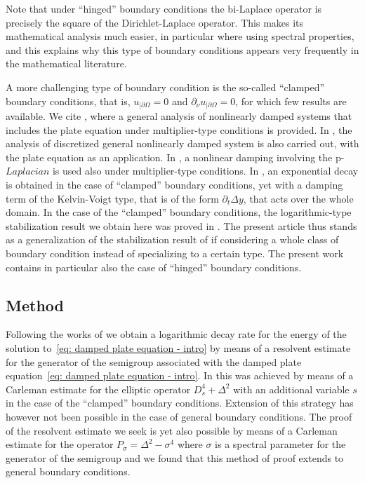\documentclass[10pt]{amsart}
\theoremstyle{plain}
\theoremstyle{definition}
\newcommand{\Psig}{P_{\sigma}}
\begin{document}
Note that under ``hinged'' boundary conditions the bi-Laplace operator
is precisely the square of the Dirichlet-Laplace operator. This makes
its mathematical analysis much easier, in particular where using
spectral properties, and this explains why this type of boundary
conditions appears very frequently in the mathematical literature.

A more challenging type of boundary condition is the so-called
``clamped'' boundary conditions,
that is, $u_{|\partial \Omega}=0$ and $\partial_\nu u_{|\partial \Omega}=0$,
for which few results are available. We
cite \cite{Alabau:06}, where a general analysis of nonlinearly damped
systems that includes the plate equation
under multiplier-type conditions is provided. In \cite{APT:17}, the
analysis of discretized general nonlinearly damped system is also
carried out, with the plate equation as an application. In \cite{Tebou:12}, a nonlinear
damping involving the p-$Laplacian$ is used also under multiplier-type
conditions. In \cite{DS:15}, an
exponential decay is obtained in the case of ``clamped'' boundary
conditions, yet with a damping term of the Kelvin-Voigt type, that is
of the form $\partial_t \Delta y$, that acts over the whole domain.
In the case of the ``clamped'' boundary conditions, the logarithmic-type stabilization
result we obtain here was proved in \cite{JL}. The present article
thus stands as a generalization of the stabilization result of
\cite{JL} if considering a whole class of boundary condition instead
of specializing to a certain type. The present work contains in
particular also the case of ``hinged'' boundary conditions.

\subsection{Method}
\label{sec: Method}
Following the works of \cite{JL,Lebeau:96,LR:97} we obtain a
logarithmic decay rate for the energy of the solution to~\eqref{eq:
damped plate equation - intro} by means of a resolvent estimate for
the generator of the semigroup associated with the damped plate
equation~\eqref{eq: damped plate equation - intro}. In \cite{JL} this
was achieved by means of a Carleman estimate for the elliptic operator
$D_s^4 + \Delta^2$ with an additional variable $s$ in the case of the
``clamped'' boundary conditions. Exten\-sion of this strategy has however
not been possible in the case of general boundary conditions. The proof of
the resolvent estimate we seek is yet also possible by means of a
Carleman estimate for the operator $\Psig=\Delta^2 - \sigma^4$ where
$\sigma$ is a spectral parameter for the generator of the semigroup
and we found that this method of proof extends to general boundary conditions.
\end{document}
